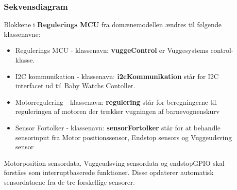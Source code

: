 \subsubsection*{Sekvensdiagram}
\label{Vuggesystem:SD} 


Blokkene i \textbf{Regulerings MCU} fra domænemodellen ændres til følgende klassenavne: \\
\begin{itemize}
\item Regulerings MCU - klassenavn: \textbf{vuggeControl} er Vuggesystems control-klasse. 
\item I2C kommunikation - klassenavn: \textbf{i2cKommunikation} står for I2C interfacet ud til Baby Watchs Contoller.
\item Motorregulering - klassenavn: \textbf{regulering} står for beregningerne til reguleringen af motoren der trækker vugningen af barnevognenskurv
\item Sensor Fortolker - klassenavn: \textbf{sensorFortolker} står for at behandle sensorinput fra Motor positionssensor, Endstop sensors og Vuggeudsving sensor
\end{itemize}

Motorposition sensordata, Vuggeudsving sensordata og endstopGPIO skal forståes som interruptbaserede funktioner. Disse opdaterer automatisk sensordataene fra de tre forskellige sensorer.

\newpage